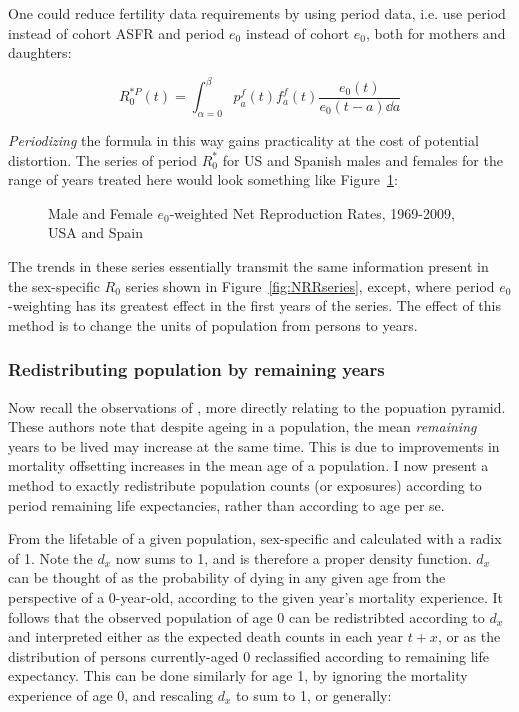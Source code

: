 One could reduce fertility data requirements by using period data, i.e.
use period instead of cohort ASFR and period $e_0$ instead of cohort $e_0$, both
for mothers and daughters:

\begin{equation}
R_{0}^{\ast P}(t) = \int _{\alpha = 0} ^{\beta} p_{a}^{f}(t) f_{a}^{f}(t)
\frac{e_{0}(t)}{e_{0}(t-a) \dd a}
\end{equation}

\textit{Periodizing} the formula in this way gains practicality at the cost of
potential distortion. The series of period $R_0^\ast$ for US and Spanish males
and females for the range of years treated here would look something like
Figure~\ref{fig:R0perHenry}:

\begin{figure}[ht!]
        \centering  
          \caption{Male and Female $e_0$-weighted Net Reproduction Rates,
          1969-2009, USA and Spain}
          \label{fig:R0perHenry}
\end{figure}

The trends in these series essentially transmit the same information
present in the sex-specific $R_0$ series shown in Figure~\ref{fig:NRRseries},
except, where period $e_0$-weighting has its greatest effect in the first years
of the series. The effect of this method is to change the units of population
from persons to years. 

\subsubsection{Redistributing population by remaining years}

Now recall the observations of \citet{sanderson2005average}, more directly
relating to the popuation pyramid. These authors note that despite ageing in a
population, the mean \textit{remaining} years to be lived may increase at the
same time. This is due to improvements in mortality offsetting increases in the
mean age of a population. I now present a method to exactly redistribute
population counts (or exposures) according to period remaining life
expectancies, rather than according to age per se.

From the lifetable of a given population, sex-specific and calculated with a
radix of 1. Note the $d_x$ now sums to 1, and is therefore a proper density
function. $d_x$ can be thought of as the probability of dying in any given age
from the perspective of a 0-year-old, according to the given year's mortality
experience. It follows that the observed population of age 0 can be redistribted
according to $d_x$ and interpreted either as the expected death counts
in each year $t+x$, or as the distribution of persons currently-aged 0
reclassified according to remaining life expectancy. This can be done similarly
for age 1, by ignoring the mortality experience of age 0, and rescaling $d_x$ to
sum to 1, or generally:

